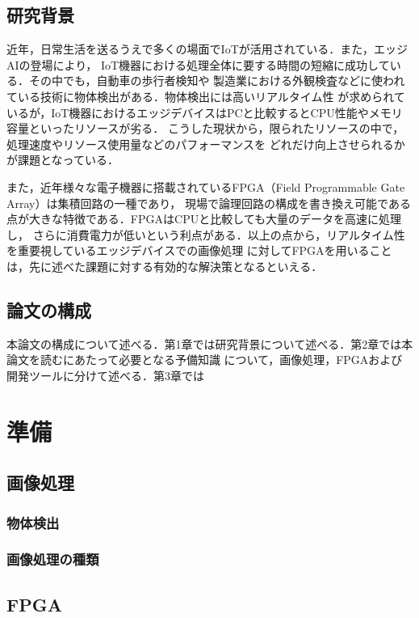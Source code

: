 \documentclass[11pt,a4j]{jreport}
\begin{document}
\section{研究背景}

近年，日常生活を送るうえで多くの場面でIoTが活用されている．また，エッジAIの登場により，
IoT機器における処理全体に要する時間の短縮に成功している．その中でも，自動車の歩行者検知や
製造業における外観検査などに使われている技術に物体検出がある．物体検出には高いリアルタイム性
が求められているが，IoT機器におけるエッジデバイスはPCと比較するとCPU性能やメモリ容量といったリソースが劣る．
こうした現状から，限られたリソースの中で，処理速度やリソース使用量などのパフォーマンスを
どれだけ向上させられるかが課題となっている．

また，近年様々な電子機器に搭載されているFPGA（Field Programmable Gate Array）は集積回路の一種であり，
現場で論理回路の構成を書き換え可能である点が大きな特徴である．FPGAはCPUと比較しても大量のデータを高速に処理し，
さらに消費電力が低いという利点がある．以上の点から，リアルタイム性を重要視しているエッジデバイスでの画像処理
に対してFPGAを用いることは，先に述べた課題に対する有効的な解決策となるといえる．


\section{論文の構成}

本論文の構成について述べる．第1章では研究背景について述べる．第2章では本論文を読むにあたって必要となる予備知識
について，画像処理，FPGAおよび開発ツールに分けて述べる．第3章では

\chapter{準備}

\section{画像処理}
\subsection{物体検出}
\subsection{画像処理の種類}

\section{FPGA}
\end{document}

